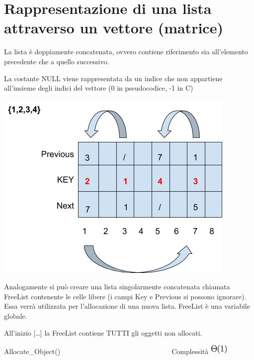 \documentclass{article}
\begin{document}
{}

\hypertarget{h.a5tr7osf4zwh}{\section{\texorpdfstring{{Rappresentazione
di una lista attraverso un vettore
(matrice)}}{Rappresentazione di una lista attraverso un vettore (matrice)}}\label{h.a5tr7osf4zwh}}

{}

{La lista è doppiamente concatenata, ovvero contiene riferimento sia
all'elemento precedente che a quello successivo.}

{}

{La costante NULL viene rappresentata da un indice che non appartiene
all'insieme degli indici del vettore (0 in pseudocodice, -1 in C)}

{}

{\includegraphics{images/image520.png}}

{}

{}

{Analogamente si può creare una lista singolarmente concatenata chiamata
FreeList contenente le celle libere (i campi Key e Previous si possono
ignorare). Essa verrà utilizzata per l'allocazione di una nuova lista.
FreeList è una variabile globale.}

{}

{All'inizio {[}\ldots{}{]} la FreeList contiene TUTTI gli oggetti non
allocati.}

{}

{Allocate\_Object()~~~~~~~~~~~~~~~~~~~~~~~~~~~~~~~~}{Complessità
}\includegraphics{images/image69.png}
\end{document}
